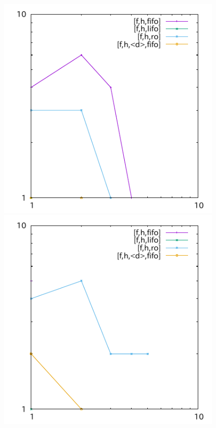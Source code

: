 \begin{figure}[tb]
\includegraphics{img/depth/airport-fuel/p19.pdf}
\includegraphics{img/depth/cybersec/p11.pdf}

\end{figure}
